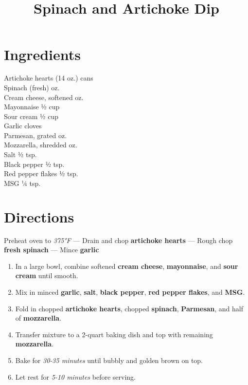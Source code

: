 \documentclass[11pt,letterpaper]{article}
\title{Spinach and Artichoke Dip}
\author{}
\date{}
\begin{document}
\maketitle
\thispagestyle{empty}

\section*{Ingredients}
\setlength{\columnsep}{20pt}
\begin{multicols}{2}
\noindent
    Artichoke hearts  (14 oz.) cans \\
    Spinach (fresh)  oz. \\
    Cream cheese, softened  oz. \\
    Mayonnaise \dotfill ½ cup \\
    Sour cream \dotfill ½ cup \\
    Garlic cloves  \\
    Parmesan, grated  oz. \\
    Mozzarella, shredded  oz. \\
    Salt \dotfill ½ tsp. \\
    Black pepper \dotfill ½ tsp. \\
    Red pepper flakes \dotfill ½ tsp. \\
    MSG \dotfill ¼ tsp. \\
\end{multicols}

\section*{Directions}

\noindent
Preheat oven to \textit{375°F} ---
Drain and chop \textbf{artichoke hearts} ---
Rough chop \textbf{fresh spinach} ---
Mince \textbf{garlic}

\begin{enumerate}
    \item In a large bowl, combine softened \textbf{cream cheese}, \textbf{mayonnaise}, and \textbf{sour cream} until smooth.
    
    \item Mix in minced \textbf{garlic}, \textbf{salt}, \textbf{black pepper}, \textbf{red pepper flakes}, and \textbf{MSG}.
    
    \item Fold in chopped \textbf{artichoke hearts}, chopped \textbf{spinach}, \textbf{Parmesan}, and half of \textbf{mozzarella}.
    
    \item Transfer mixture to a 2-quart baking dish and top with remaining \textbf{mozzarella}.
    
    \item Bake for \textit{30-35 minutes} until bubbly and golden brown on top.
    
    \item Let rest for \textit{5-10 minutes} before serving.
\end{enumerate}
\end{document}
